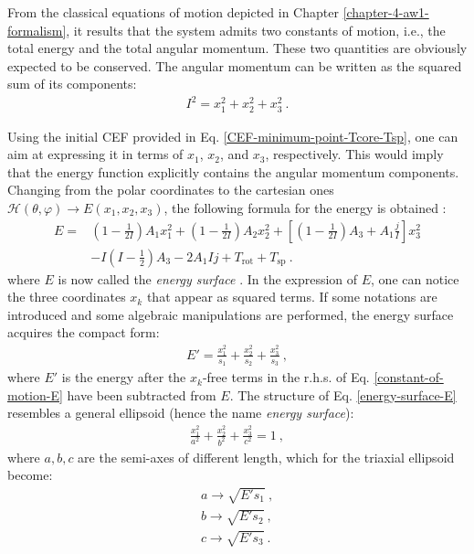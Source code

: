 From the classical equations of motion depicted in Chapter \ref{chapter-4-aw1-formalism}, it results that the system admits two constants of motion, i.e., the total energy and the total angular momentum. These two quantities are obviously expected to be conserved. The angular momentum can be written as the squared sum of its components:
\begin{align}
    I^2=x_1^2+x_2^2+x_3^2\ .
    \label{constant-of-motion-I}
\end{align}

Using the initial CEF provided in Eq. \ref{CEF-minimum-point-Tcore-Tsp}, one can aim at expressing it in terms of $x_1$, $x_2$, and $x_3$, respectively. This would imply that the energy function explicitly contains the angular momentum components. Changing from the polar coordinates to the cartesian ones $\mathcal{H}(\theta,\varphi)\longrightarrow E(x_1,x_2,x_3)$, the following formula for the energy is obtained \cite{poenaru2021extensive2}:
\begin{align}
    E=&\left(1-\frac{1}{2I}\right)A_1x_1^2+\left(1-\frac{1}{2I}\right)A_2x_2^2+\left[\left(1-\frac{1}{2I}\right)A_3+A_1\frac{j}{I}\right]x_3^2\nonumber\\
    &-I\left(I-\frac{1}{2}\right)A_3-2A_1Ij+T_\text{rot}+T_\text{sp}\ .
    \label{constant-of-motion-E}
\end{align}
where $E$ is now called the \emph{energy surface} \cite{poenaru2021extensive2}. In the expression of $E$, one can notice the three coordinates $x_k$ that appear as squared terms. If some notations are introduced and some algebraic manipulations are performed, the energy surface acquires the compact form:
\begin{align}
    E'=\frac{x_1^2}{s_1}+\frac{x_2^2}{s_2}+\frac{x_3^2}{s_3}\ ,
    \label{energy-surface-E}
\end{align}
where $E'$ is the energy after the $x_k$-free terms in the r.h.s. of Eq. \ref{constant-of-motion-E} have been subtracted from $E$. The structure of Eq. \ref{energy-surface-E} resembles a general ellipsoid (hence the name \emph{energy surface}):
\begin{align}
    \frac{x_1^2}{a^2}+\frac{x_2^2}{b^2}+\frac{x_3^2}{c^2}=1\ ,
\end{align}
where $a,b,c$ are the semi-axes of different length, which for the triaxial ellipsoid become:
\begin{align}
    a\to\sqrt{E's_1}\nonumber\ ,\\
    b\to\sqrt{E's_2}\nonumber\ ,\\
    c\to\sqrt{E's_3}\ .
    \label{semi-axes-lenghts-E}
\end{align}

